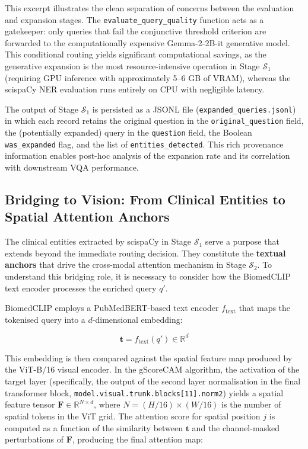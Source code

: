 This excerpt illustrates the clean separation of concerns between the evaluation and expansion stages. The \texttt{evaluate\_query\_quality} function acts as a gatekeeper: only queries that fail the conjunctive threshold criterion are forwarded to the computationally expensive Gemma-2-2B-it generative model. This conditional routing yields significant computational savings, as the generative expansion is the most resource-intensive operation in Stage $\mathcal{S}_1$ (requiring GPU inference with approximately 5--6 GB of VRAM), whereas the scispaCy NER evaluation runs entirely on CPU with negligible latency.

The output of Stage $\mathcal{S}_1$ is persisted as a JSONL file (\texttt{expanded\_queries.jsonl}) in which each record retains the original question in the \texttt{original\_question} field, the (potentially expanded) query in the \texttt{question} field, the Boolean \texttt{was\_expanded} flag, and the list of \texttt{entities\_detected}. This rich provenance information enables post-hoc analysis of the expansion rate and its correlation with downstream VQA performance.

\subsection{Bridging to Vision: From Clinical Entities to Spatial Attention Anchors}
\label{sec:3_2_5}

The clinical entities extracted by scispaCy in Stage $\mathcal{S}_1$ serve a purpose that extends beyond the immediate routing decision. They constitute the \textbf{textual anchors} that drive the cross-modal attention mechanism in Stage $\mathcal{S}_2$. To understand this bridging role, it is necessary to consider how the BiomedCLIP text encoder processes the enriched query $q'$.

BiomedCLIP employs a PubMedBERT-based text encoder $f_{\text{text}}$ that maps the tokenised query into a $d$-dimensional embedding:

\[
\mathbf{t} = f_{\text{text}}(q') \in \mathbb{R}^d
\]

This embedding is then compared against the spatial feature map produced by the ViT-B/16 visual encoder. In the gScoreCAM algorithm, the activation of the target layer (specifically, the output of the second layer normalisation in the final transformer block, \texttt{model.visual.trunk.blocks[11].norm2}) yields a spatial feature tensor $\mathbf{F} \in \mathbb{R}^{N \times d}$, where $N = (H/16) \times (W/16)$ is the number of spatial tokens in the ViT grid. The attention score for spatial position $j$ is computed as a function of the similarity between $\mathbf{t}$ and the channel-masked perturbations of $\mathbf{F}$, producing the final attention map:

